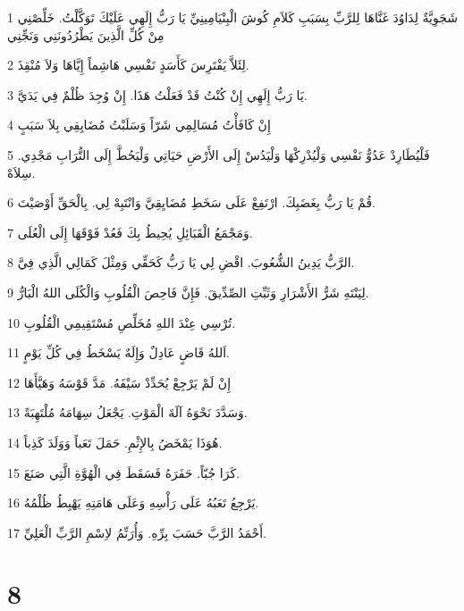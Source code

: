 \par 1 شَجَوِيَّةٌ لِدَاوُدَ غَنَّاهَا لِلرَّبِّ بِسَبَبِ كَلاَمِ كُوشَ الْبِنْيَامِينِيِّ يَا رَبُّ إِلَهِي عَلَيْكَ تَوَكَّلْتُ. خَلِّصْنِي مِنْ كُلِّ الَّذِينَ يَطْرُدُونَنِي وَنَجِّنِي
\par 2 لِئَلاَّ يَفْتَرِسَ كَأَسَدٍ نَفْسِي هَاشِماً إِيَّاهَا وَلاَ مُنْقِذَ.
\par 3 يَا رَبُّ إِلَهِي إِنْ كُنْتُ قَدْ فَعَلْتُ هَذَا. إِنْ وُجِدَ ظُلْمٌ فِي يَدَيَّ.
\par 4 إِنْ كَافَأْتُ مُسَالِمِي شَرّاً وَسَلَبْتُ مُضَايِقِي بِلاَ سَبَبٍ
\par 5 فَلْيُطَارِدْ عَدُوٌّ نَفْسِي وَلْيُدْرِكْهَا وَلْيَدُسْ إِلَى الأَرْضِ حَيَاتِي وَلْيَحُطَّ إِلَى التُّرَابِ مَجْدِي. سِلاَهْ.
\par 6 قُمْ يَا رَبُّ بِغَضَبِكَ. ارْتَفِعْ عَلَى سَخَطِ مُضَايِقِيَّ وَانْتَبِهْ لِي. بِالْحَقِّ أَوْصَيْتَ.
\par 7 وَمَجْمَعُ الْقَبَائِلِ يُحِيطُ بِكَ فَعُدْ فَوْقَهَا إِلَى الْعُلَى.
\par 8 الرَّبُّ يَدِينُ الشُّعُوبَ. اقْضِ لِي يَا رَبُّ كَحَقِّي وَمِثْلَ كَمَالِي الَّذِي فِيَّ.
\par 9 لِيَنْتَهِ شَرُّ الأَشْرَارِ وَثَبِّتِ الصِّدِّيقَ. فَإِنَّ فَاحِصَ الْقُلُوبِ وَالْكُلَى اللهُ الْبَارُّ.
\par 10 تُرْسِي عِنْدَ اللهِ مُخَلِّصِ مُسْتَقِيمِي الْقُلُوبِ.
\par 11 اَللهُ قَاضٍ عَادِلٌ وَإِلَهٌ يَسْخَطُ فِي كُلِّ يَوْمٍ.
\par 12 إِنْ لَمْ يَرْجِعْ يُحَدِّدْ سَيْفَهُ. مَدَّ قَوْسَهُ وَهَيَّأَهَا
\par 13 وَسَدَّدَ نَحْوَهُ آلَةَ الْمَوْتِ. يَجْعَلُ سِهَامَهُ مُلْتَهِبَةً.
\par 14 هُوَذَا يَمْخَضُ بِالإِثْمِ. حَمَلَ تَعَباً وَوَلَدَ كَذِباً.
\par 15 كَرَا جُبّاً. حَفَرَهُ فَسَقَطَ فِي الْهُوَّةِ الَّتِي صَنَعَ.
\par 16 يَرْجِعُ تَعَبُهُ عَلَى رَأْسِهِ وَعَلَى هَامَتِهِ يَهْبِطُ ظُلْمُهُ.
\par 17 أَحْمَدُ الرَّبَّ حَسَبَ بِرِّهِ. وَأُرَنِّمُ لاِسْمِ الرَّبِّ الْعَلِيِّ.

\chapter{8}

